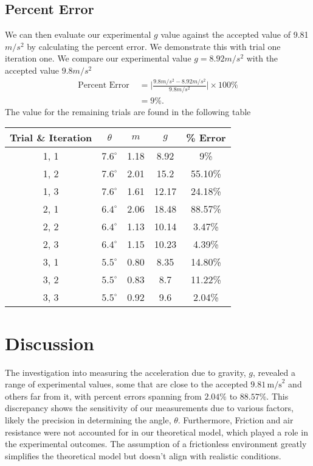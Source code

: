 \documentclass{report}
\begin{document}
    \subsection{Percent Error}
    \bigbreak \noindent 
    We can then evaluate our experimental $g$ value against the accepted value of 9.81 $m/s^{2}$ by calculating the percent error. We demonstrate this with trial one iteration one. We compare our experimental value $g =8.92 m/s^{2}$ with the accepted value $9.8 m/s^{2} $
    \begin{align*}
        \text{Percent Error } &= \bigg\lvert \frac{9.8 m/s^{2} - 8.92 m/s^{2}}{9.8 m/s^{2}} \bigg\rvert \times 100\% \\
        &=9\%
    .\end{align*}
    The value for the remaining trials are found in the following table
    \bigbreak \noindent 
    \begin{center}
    \begin{tabular}{c|c|c|c|c}
        Trial \& Iteration & $\theta$ & $m$ & $g$ & \% Error \\
        \hline
        1, 1 & $7.6^{\circ}$ & 1.18 & 8.92 & 9\% \\
        1, 2 & $7.6^{\circ}$ & 2.01 & 15.2 & 55.10\% \\
        1, 3 & $7.6^{\circ}$ & 1.61 & 12.17 & 24.18\% \\
        2, 1 & $6.4^{\circ}$ & 2.06 & 18.48 & 88.57\% \\
        2, 2  & $6.4^{\circ}$ & 1.13 & 10.14 & 3.47\% \\
        2, 3 & $6.4^{\circ}$ & 1.15 & 10.23 & 4.39\% \\
        3, 1 & $5.5^{\circ}$ & 0.80 & 8.35 & 14.80\% \\
        3, 2 & $5.5^{\circ}$ & 0.83 & 8.7 & 11.22\% \\
        3, 3 & $5.5^{\circ}$ & 0.92  & 9.6 & 2.04\% \\
    \end{tabular}
    \end{center}


    \bigbreak \noindent 
    \section{Discussion}
    \bigbreak \noindent 
    The investigation into measuring the acceleration due to gravity, \(g\), revealed a range of experimental values, some that are close to the accepted \(9.81 \, \text{m/s}^2\) and others far from it, with percent errors spanning from \(2.04\%\) to \(88.57\%\). This discrepancy shows the sensitivity of our measurements due to various factors, likely the precision in determining the angle, \(\theta\).
    \bigbreak \noindent 
    Furthermore, Friction and air resistance were not accounted for in our theoretical model, which played a role in the experimental outcomes. The assumption of a frictionless environment greatly simplifies the theoretical model but doesn't align with realistic conditions.
\end{document}
